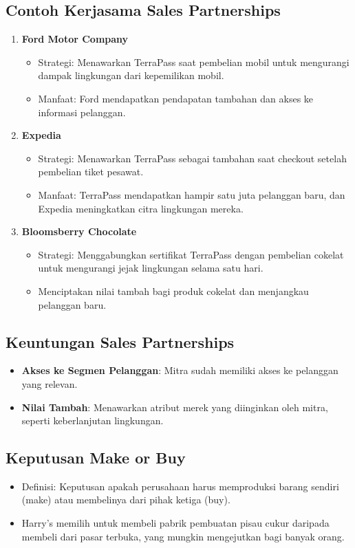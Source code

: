 \documentclass{article}
\begin{document}
\subsection{Contoh Kerjasama Sales Partnerships}
\begin{enumerate}
    \item \textbf{Ford Motor Company}
          \begin{itemize}
              \item Strategi: Menawarkan TerraPass saat pembelian mobil untuk mengurangi dampak lingkungan dari kepemilikan mobil.
              \item Manfaat: Ford mendapatkan pendapatan tambahan dan akses ke informasi pelanggan.
          \end{itemize}
    \item \textbf{Expedia}
          \begin{itemize}
              \item Strategi: Menawarkan TerraPass sebagai tambahan saat checkout setelah pembelian tiket pesawat.
              \item Manfaat: TerraPass mendapatkan hampir satu juta pelanggan baru, dan Expedia meningkatkan citra lingkungan mereka.
          \end{itemize}
    \item \textbf{Bloomsberry Chocolate}
          \begin{itemize}
              \item Strategi: Menggabungkan sertifikat TerraPass dengan pembelian cokelat untuk mengurangi jejak lingkungan selama satu hari.
              \item Menciptakan nilai tambah bagi produk cokelat dan menjangkau pelanggan baru.
          \end{itemize}
\end{enumerate}

\subsection{Keuntungan Sales Partnerships}
\begin{itemize}
    \item \textbf{Akses ke Segmen Pelanggan}: Mitra sudah memiliki akses ke pelanggan yang relevan.
    \item \textbf{Nilai Tambah}: Menawarkan atribut merek yang diinginkan oleh mitra, seperti keberlanjutan lingkungan.
\end{itemize}

\subsection{Keputusan Make or Buy}
\begin{itemize}
    \item Definisi: Keputusan apakah perusahaan harus memproduksi barang sendiri (make) atau membelinya dari pihak ketiga (buy).
    \item Harry's memilih untuk membeli pabrik pembuatan pisau cukur daripada membeli dari pasar terbuka, yang mungkin mengejutkan bagi banyak orang.
\end{itemize}
\end{document}
